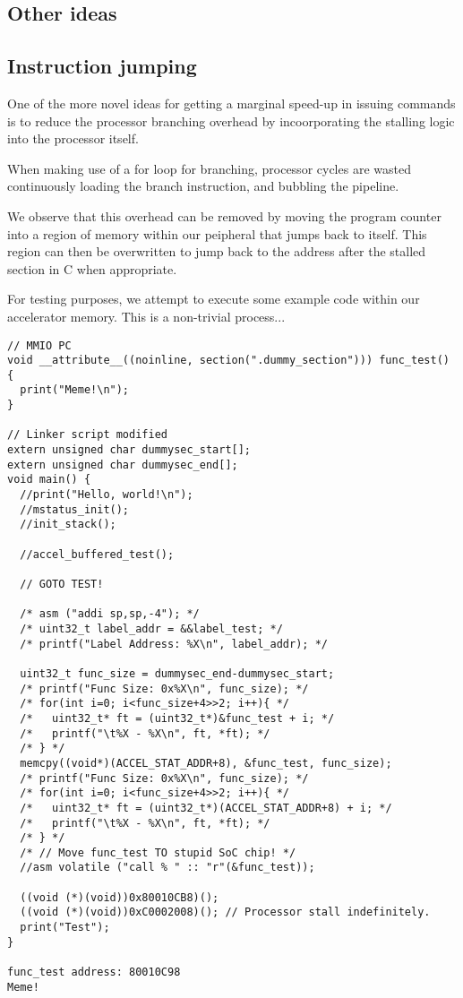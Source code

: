 \documentclass[a4paper,8pt]{report}
\begin{document}

\subsection{Other ideas}



\subsection{Instruction jumping}
One of the more novel ideas for getting a marginal speed-up in issuing commands
is to reduce the processor branching overhead by incoorporating the stalling
logic into the processor itself.

When making use of a for loop for branching, processor cycles are wasted
continuously loading the branch instruction, and bubbling the pipeline.

We observe that this overhead can be removed by moving the program counter into
a region of memory within our peipheral that jumps back to itself. This region
can then be overwritten to jump back to the address after the stalled section in
C when appropriate.

For testing purposes, we attempt to execute some example code within our
accelerator memory. This is a non-trivial process...
\begin{verbatim}
// MMIO PC
void __attribute__((noinline, section(".dummy_section"))) func_test() {
  print("Meme!\n");
}

// Linker script modified
extern unsigned char dummysec_start[];
extern unsigned char dummysec_end[];
void main() {
  //print("Hello, world!\n");
  //mstatus_init();
  //init_stack();

  //accel_buffered_test();

  // GOTO TEST!

  /* asm ("addi sp,sp,-4"); */
  /* uint32_t label_addr = &&label_test; */
  /* printf("Label Address: %X\n", label_addr); */

  uint32_t func_size = dummysec_end-dummysec_start;
  /* printf("Func Size: 0x%X\n", func_size); */
  /* for(int i=0; i<func_size+4>>2; i++){ */
  /*   uint32_t* ft = (uint32_t*)&func_test + i; */
  /*   printf("\t%X - %X\n", ft, *ft); */
  /* } */
  memcpy((void*)(ACCEL_STAT_ADDR+8), &func_test, func_size);
  /* printf("Func Size: 0x%X\n", func_size); */
  /* for(int i=0; i<func_size+4>>2; i++){ */
  /*   uint32_t* ft = (uint32_t*)(ACCEL_STAT_ADDR+8) + i; */
  /*   printf("\t%X - %X\n", ft, *ft); */
  /* } */
  /* // Move func_test TO stupid SoC chip! */
  //asm volatile ("call % " :: "r"(&func_test));

  ((void (*)(void))0x80010CB8)();
  ((void (*)(void))0xC0002008)(); // Processor stall indefinitely.
  print("Test");
}

func_test address: 80010C98
Meme!
\end{verbatim}
\end{document}
